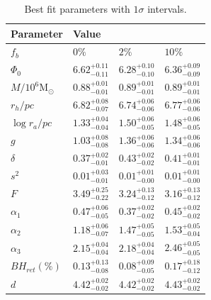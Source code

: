 \begin{table}
	\centering
	\caption{Best fit parameters with $1\sigma$ intervals.}
	\begin{tabular}{l l l l}

		\hline
		Parameter                 & Value                                                                    \\
		\hline
		$f_b$                     & $0\%$                  & $2\%$                  & $10\%$                 \\
		$\Phi_0$                  & $6.62^{+0.11}_{-0.11}$ & $6.28^{+0.10}_{-0.10}$ & $6.36^{+0.09}_{-0.09}$ \\
		$M/10^6 \mathrm{M}_\odot$ & $0.88^{+0.01}_{-0.01}$ & $0.89^{+0.01}_{-0.01}$ & $0.89^{+0.01}_{-0.01}$ \\
		$r_h / pc$                & $6.82^{+0.08}_{-0.07}$ & $6.74^{+0.06}_{-0.06}$ & $6.77^{+0.06}_{-0.06}$ \\
		$\log{r_a / pc}$          & $1.33^{+0.04}_{-0.04}$ & $1.50^{+0.06}_{-0.05}$ & $1.48^{+0.06}_{-0.05}$ \\
		$g$                       & $1.03^{+0.08}_{-0.08}$ & $1.36^{+0.06}_{-0.06}$ & $1.34^{+0.06}_{-0.06}$ \\
		$\delta$                  & $0.37^{+0.02}_{-0.01}$ & $0.43^{+0.02}_{-0.02}$ & $0.41^{+0.01}_{-0.01}$ \\
		$s^2$                     & $0.01^{+0.03}_{-0.01}$ & $0.01^{+0.01}_{-0.00}$ & $0.01^{+0.01}_{-0.00}$ \\
		$F$                       & $3.49^{+0.25}_{-0.22}$ & $3.24^{+0.13}_{-0.12}$ & $3.16^{+0.13}_{-0.12}$ \\
		$\alpha_1$                & $0.47^{+0.06}_{-0.05}$ & $0.37^{+0.02}_{-0.02}$ & $0.45^{+0.02}_{-0.02}$ \\
		$\alpha_2$                & $1.18^{+0.06}_{-0.07}$ & $1.47^{+0.05}_{-0.05}$ & $1.53^{+0.05}_{-0.04}$ \\
		$\alpha_3$                & $2.15^{+0.04}_{-0.04}$ & $2.18^{+0.04}_{-0.04}$ & $2.46^{+0.05}_{-0.05}$ \\
		$BH_{ret} (\%)$           & $0.13^{+0.13}_{-0.08}$ & $0.08^{+0.09}_{-0.05}$ & $0.17^{+0.18}_{-0.12}$ \\
		$d$                       & $4.42^{+0.02}_{-0.02}$ & $4.42^{+0.02}_{-0.02}$ & $4.43^{+0.02}_{-0.02}$ \\
		\hline
	\end{tabular}
	\label{tab:parameters_all}
\end{table}







